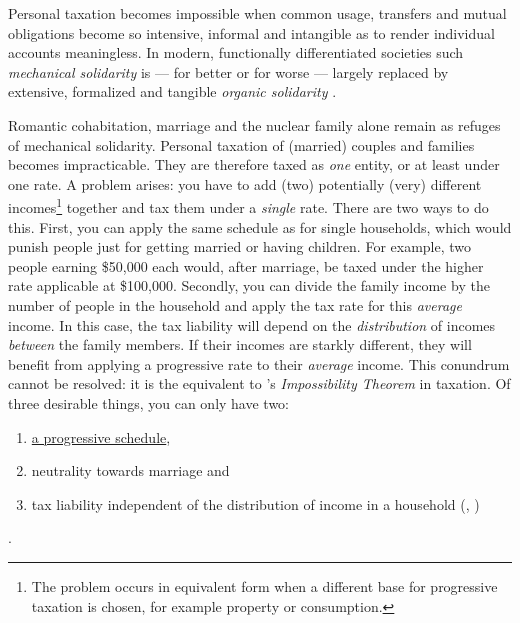 Personal taxation becomes impossible when common usage, transfers and mutual obligations become so intensive, informal and intangible as to render individual accounts meaningless.
In modern, functionally differentiated societies such \emph{mechanical solidarity} is --- for better or for worse --- largely replaced by extensive, formalized and tangible \emph{organic solidarity} \citep{Durkheim-1893-aa}.


Romantic cohabitation, marriage and the nuclear family alone remain as refuges of mechanical solidarity.
Personal taxation of (married) couples and families becomes impracticable.
They are therefore taxed as \emph{one} entity, or at least under one rate.
A problem arises:
you have to add (two) potentially (very) different incomes\footnote{The problem occurs in equivalent form when a different base for progressive taxation is chosen, for example property or consumption.} together and tax them under a \emph{single} rate.
There are two ways to do this.
First, you can apply the same schedule as for single households, which would punish people just for getting married or having children.
For example, two people earning \$50,000 each would, after marriage, be taxed under the higher rate applicable at \$100,000.
Secondly, you can divide the family income by the number of people in the household and apply the tax rate for this \emph{average} income.
In this case, the tax liability will depend on the \emph{distribution} of incomes \emph{between} the family members.
If their incomes are starkly different, they will benefit from applying a progressive rate to their \emph{average} income.
This conundrum cannot be resolved:
it is the equivalent to \citeauthor{Arrow1950}'s \emph{Impossibility Theorem} in taxation.
Of three desirable things, you can only have two:
\begin{enumerate}
	\item \href{des:SharpProgression}{a progressive schedule},
	\item neutrality towards marriage and
	\item tax liability independent of the distribution of income in a household (\citealt[124]{Moffitt2003}, \citealt[29]{Dalsgaard2005})
\end{enumerate}
.


